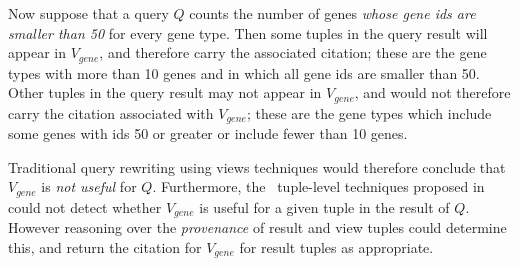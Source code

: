 

Now suppose that a query $Q$ counts the number of genes \textit{whose gene ids are smaller than 50} for every gene type. Then some tuples in the query result will appear in $V_{gene}$, and therefore carry the associated citation; these are the gene types with more than 10 genes and in which all gene ids are smaller than 50. Other tuples in the query result may not appear in $V_{gene}$, and would not therefore carry the citation associated with $V_{gene}$; these are the gene types which 
include some genes with ids 50 or greater
or include fewer than 10 genes.  

Traditional query rewriting using views techniques would therefore conclude that $V_{gene}$ is {\em not useful} for $Q$.  Furthermore, the \rba\ tuple-level techniques proposed in~\cite{wu2018data} could not detect whether $V_{gene}$ is useful for a given tuple in the result of $Q$.
However reasoning over the {\em provenance} of result  and view tuples could 
determine this, and return the citation for $V_{gene}$ for result tuples as appropriate.

